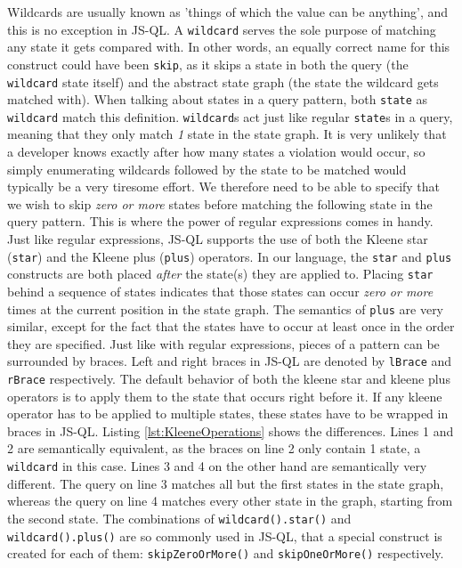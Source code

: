 Wildcards are usually known as 'things of which the value can be anything', and this is no exception in JS-QL. A \texttt{wildcard} serves the sole purpose of matching any state it gets compared with. In other words, an equally correct name for this construct could have been \texttt{skip}, as it skips a state in both the query (the \texttt{wildcard} state itself) and the abstract state graph (the state the wildcard gets matched with). When talking about states in a query pattern, both \texttt{state} as \texttt{wildcard} match this definition. \texttt{wildcard}s act just like regular \texttt{state}s in a query, meaning that they only match \textit{1} state in the state graph. It is very unlikely that a developer knows exactly after how many states a violation would occur, so simply enumerating wildcards followed by the state to be matched would typically be a very tiresome effort. We therefore need to be able to specify that we wish to skip \textit{zero or more} states before matching the following state in the query pattern. This is where the power of regular expressions comes in handy. Just like regular expressions, JS-QL supports the use of both the Kleene star (\texttt{star}) and the Kleene plus (\texttt{plus}) operators. In our language, the \texttt{star} and \texttt{plus} constructs are both placed \textit{after} the state(s) they are applied to. Placing \texttt{star} behind a sequence of states indicates that those states can occur \textit{zero or more} times at the current position in the state graph. The semantics of \texttt{plus} are very similar, except for the fact that the states have to occur at least once in the order they are specified. Just like with regular expressions, pieces of a pattern can be surrounded by braces. Left and right braces in JS-QL are denoted by \texttt{lBrace} and \texttt{rBrace} respectively. The default behavior of both the kleene star and kleene plus operators is to apply them to the state that occurs right before it. If any kleene operator has to be applied to multiple states, these states have to be wrapped in braces in JS-QL. Listing \ref{lst:KleeneOperations} shows the differences. Lines 1 and 2 are semantically equivalent, as the braces on line 2 only contain 1 state, a \texttt{wildcard} in this case. Lines 3 and 4 on the other hand are semantically very different. The query on line 3 matches all but the first states in the state graph, whereas the query on line 4 matches every other state in the graph, starting from the second state. The combinations of \texttt{wildcard().star()} and \texttt{wildcard().plus()} are so commonly used in JS-QL, that a special construct is created for each of them: \texttt{skipZeroOrMore()} and \texttt{skipOneOrMore()} respectively.


